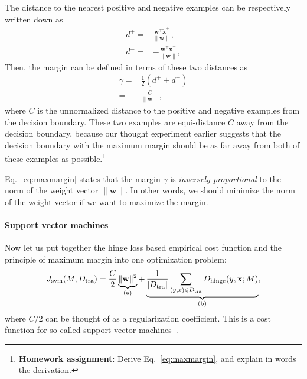 \documentclass{report}
\newcommand{\vect}[1]{\mathbf{#1}}
\newcommand{\vx}[0]{\vect{x}}
\newcommand{\vw}[0]{\vect{w}}
\newcommand{\hinge}{\text{hinge}}
\newcommand{\tra}{\text{tra}}
\begin{document}
The distance to the nearest positive and negative examples can be respectively
written down as 
\begin{align*}
    d^+ =& \frac{\vw^\top \tilde{\vx}^+}{\| \vw \|}, \\
    d^- =& -\frac{\vw^\top \tilde{\vx}^-}{\| \vw \|}, 
\end{align*}
Then, the margin can be defined in terms of these two distances as
\begin{align}
    \label{eq:maxmargin}
    \gamma =& \frac{1}{2} (d^+ + d^-) \\
    =& \frac{C}{\|\vw\|},
\end{align}
where $C$ is the unnormalized distance to the positive and negative examples
from the decision boundary. These two examples are equi-distance $C$ away from
the decision boundary, because our thought experiment earlier suggests that the
decision boundary with the maximum margin should be as far away from both of
these examples as possible.\footnote{
    {\bf Homework assignment}: Derive Eq.~\eqref{eq:maxmargin}, and explain in
    words the derivation. 
}

Eq.~\eqref{eq:maxmargin} states that the margin $\gamma$ is {\it inversely
proportional} to the norm of the weight vector $\| \vw\|$. In other words, we
should minimize the norm of the weight vector if we want to maximize the margin.

\paragraph{Support vector machines}

Now let us put together the hinge loss based empirical cost function and the
principle of maximum margin into one optimization problem:
\begin{align}
    \label{eq:svm}
    J_{\text{svm}}(M,D_{\tra}) = \frac{C}{2}
    \underbrace{\|\vw\|^2}_{\mathclap{\text{(a)}}} + 
    \underbrace{\frac{1}{|D_{\tra}|} \sum_{(y,x)
    \in D_{\tra}} D_{\hinge}(y, \vx; M)}_{
        \mathclap{\text{(b)}}
    },
\end{align}
where $C/2$ can be thought of as a regularization coefficient. This is a cost
function for so-called support vector machines~\cite{cortes1995support}. 
\end{document}
